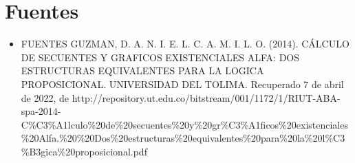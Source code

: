 \hypertarget{fuentes}{%
\section{Fuentes}\label{fuentes}}

\begin{itemize}
\tightlist
\item
  FUENTES GUZMAN, D. A. N. I. E. L. C. A. M. I. L. O. (2014). CÁLCULO DE
  SECUENTES Y GRAFICOS EXISTENCIALES ALFA: DOS ESTRUCTURAS EQUIVALENTES
  PARA LA LOGICA PROPOSICIONAL. UNIVERSIDAD DEL TOLIMA. Recuperado 7 de
  abril de 2022, de
  http://repository.ut.edu.co/bitstream/001/1172/1/RIUT-ABA-spa-2014-C\%C3\%A1lculo\%20de\%20secuentes\%20y\%20gr\%C3\%A1ficos\%20existenciales\%20Alfa.\%20\%20Dos\%20estructuras\%20equivalentes\%20para\%20la\%20l\%C3\%B3gica\%20proposicional.pdf
\end{itemize}
